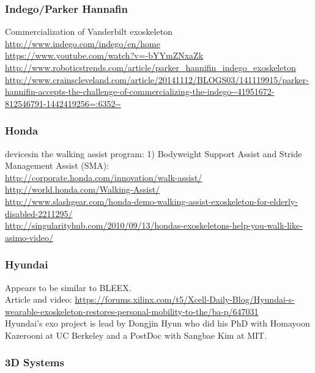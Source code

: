 \subsubsection{Indego/Parker Hannafin}

\noindent
Commercialization of Vanderbilt exoskeleton\\
\url{http://www.indego.com/indego/en/home}\\
\url{https://www.youtube.com/watch?v=-bYYmZNxaZk}\\
\url{http://www.roboticstrends.com/article/parker_hannifin_indego_exoskeleton}\\
\url{http://www.crainscleveland.com/article/20141112/BLOGS03/141119915/parker-hannifin-accepts-the-challenge-of-commercializing-the-indego--41951672-812546791-1442419256=:6352--}\\

\subsubsection{Honda}

 devicesin the walking assist program: 1) Bodyweight Support Assist and
Stride Management Assist (SMA):\\
\url{http://corporate.honda.com/innovation/walk-assist/}\\
\url{http://world.honda.com/Walking-Assist/}\\
\url{http://www.slashgear.com/honda-demo-walking-assist-exoskeleton-for-elderly-disabled-2211295/}\\
\url{http://singularityhub.com/2010/09/13/hondas-exoskeletons-help-you-walk-like-asimo-video/}\\

\subsubsection{Hyundai}

\noindent
Appears to be similar to BLEEX.\\
Article and video: \url{https://forums.xilinx.com/t5/Xcell-Daily-Blog/Hyundai-s-wearable-exoskeleton-restores-personal-mobility-to-the/ba-p/647031}\\
Hyundai's exo project is lead by Dongjin Hyun who did his
PhD with Homayoon Kazerooni at UC Berkeley and a PostDoc with Sangbae
Kim at MIT.

\subsubsection{3D Systems}

